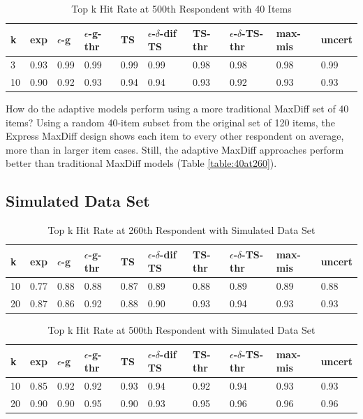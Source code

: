 \documentclass[nonblindrev]{informs3}
\newcommand{\fixedexpressS}{\textbf{exp}}
\newcommand{\egreedyS}{$\epsilon$-\textbf{g}}
\newcommand{\egreedythresS}{$\epsilon$-\textbf{g-thr}}
\newcommand{\misminS}{\textbf{max-mis}}
\newcommand{\tsS}{\textbf{TS} }
\newcommand{\edtsS}{$\epsilon$-$\delta$-\textbf{dif TS} }
\newcommand{\tsthresS}{\textbf{TS-thr} }
\newcommand{\edtsthresS}{$\epsilon$-$\delta$-\textbf{TS-thr} }
\newcommand{\uncertS}{\textbf{uncert} }
\begin{document}
\begin{table}
\caption{Top k Hit Rate at 500th Respondent with 40 Items}
\begin{center}
\begin{tabular}{llllllllll}
\hline   k &  \fixedexpressS & \egreedyS&\egreedythresS&\tsS&\edtsS&\tsthresS&\edtsthresS& \misminS& \uncertS \\ \hline    
3 & 0.93 & 0.99 & 0.99 & 0.99 & 0.99 & 0.98 & 0.98 & 0.98 &  0.99 \\  10 & 0.90 &   0.92 &  0.93  & 0.94 & 0.94 & 0.93 &    0.92 & 0.93 &  0.93 \end{tabular}
\end{center}
\label{table:40at500}
\end{table}
How do the adaptive models perform using a more traditional MaxDiff set of 40 items? Using a random 40-item subset from the original set of 120 items, the Express MaxDiff design shows each item to every other respondent on average, more than in larger item cases. Still, the adaptive MaxDiff approaches perform better than traditional MaxDiff models (Table \ref{table:40at260}).


\subsection{Simulated Data Set}
\begin{table}
\caption{Top k Hit Rate at 260th Respondent with Simulated Data Set}
\begin{center}
\begin{tabular}{llllllllll}
\hline   k &  \fixedexpressS & \egreedyS&\egreedythresS&\tsS&\edtsS&\tsthresS&\edtsthresS& \misminS& \uncertS \\\hline  10 & 0.77 &   0.88 & 0.88  & 0.87&0.89 & 	0.88&0.89 & 0.89 &  0.88 \\  20 &  0.87 &  0.86 &   0.92  & 0.88&0.90 &  	0.93&0.94&  0.93 &  0.93 \end{tabular}
\end{center}
\label{table:nice260}
\end{table}

\begin{table}
\caption{Top k Hit Rate at 500th Respondent with Simulated Data Set}
\begin{center}
\begin{tabular}{llllllllll}
\hline   k &  \fixedexpressS & \egreedyS&\egreedythresS&\tsS&\edtsS&\tsthresS&\edtsthresS& \misminS& \uncertS  \\\hline    10 & 0.85&0.92&0.92 & 0.93&0.94 & 0.92&0.94&0.93 &   0.93 \\  20 & 0.90&0.90&0.95& 0.90 &0.93 & 0.95&0.96 &0.96& 0.96 
\end{tabular}
\end{center}
\label{table:nice500}
\end{table}
\end{document}
